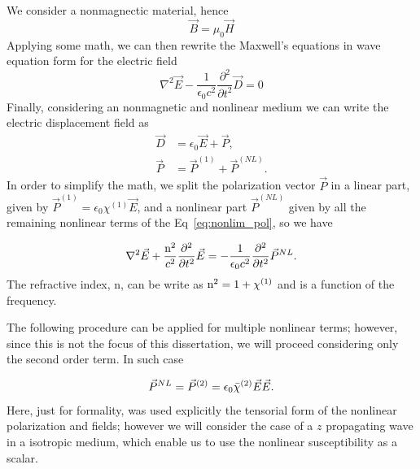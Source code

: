 We consider a nonmagnectic material, hence
\begin{equation}
    \vec{B} = \mu_0 \vec{H}
\end{equation}
%
Applying some math, we can then rewrite the Maxwell's equations in wave equation form for the electric field 
\begin{equation}
    \nabla^2\vec{E} - \frac{1}{\epsilon_0 c^2}\frac{\partial^2}{\partial t^2}\vec{D} = 0
\end{equation}
Finally, considering an nonmagnetic and nonlinear medium we can write the electric displacement field as
\begin{subequations}
    \begin{align}
        \vec{D} &= \epsilon_0\vec{E} +\vec{P},\\
        \vec{P} &= \vec{P}^{(1)} + \vec{P}^{(NL)}.
    \end{align}
\end{subequations}
In order to simplify the math, we split the polarization vector $\vec{P}$ in a linear part, given by $\vec{P}^{(1)} = \epsilon_0\chi^{(1)}\vec{E}$, and a nonlinear part $\vec{P}^{(NL)}$ given by all the remaining nonlinear terms of the Eq~\ref{eq:nonlim_pol}, so we have

\begin{equation}
    \nabla^2\vec{E} +\frac{\text{n}^2}{c^2}\frac{\partial^2}{\partial t^2}\vec{E} = -\frac{1}{\epsilon_0 c^2} \frac{\partial^2}{\partial t^2}\vec{P}^{NL}.
    \label{eq:wave_equation_nonlinear}
\end{equation}
The refractive index, n, can be write as $\text{n}^2= 1 + \chi^{(1)}$ and is a function of the frequency.

The following procedure can be applied for multiple nonlinear terms; however, since this is not the focus of this dissertation, we will proceed considering only the second order term. In such case

\begin{equation}
    \vec{P}^{NL} = \vec{P}^{(2)} = \epsilon_0\Bar{\chi}^{(2)}\vec{E}\vec{E}.
    \label{eq:nonlinear_polarization}
\end{equation}
Here, just for formality, was used explicitly the tensorial form of the nonlinear polarization and fields; however we will consider the case of a $z$ propagating wave in a isotropic medium, which enable us to use the nonlinear susceptibility as a scalar.

